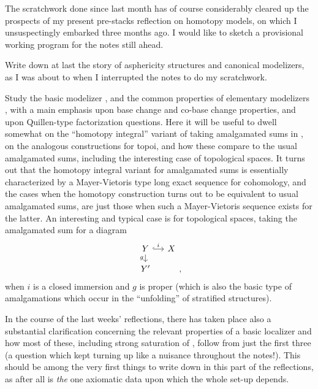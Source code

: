 \bigbreak
\noindent\hfill{}\par

\label{sec:71}%
The scratchwork done since last month has of course considerably
cleared up the prospects of my present pre-stacks reflection on
homotopy models, on which I unsuspectingly embarked three months
ago. I would like to sketch a provisional working program for the
notes still ahead.

 Write down at last the story of asphericity
structures and canonical modelizers, as I was about to when I
interrupted the notes to do my scratchwork.

 Study the basic modelizer \Cat, and the
common properties of elementary modelizers \Ahat, with a main emphasis
upon base change and co-base change properties, and upon Quillen-type
factorization questions. Here it will be useful to dwell somewhat on
the ``homotopy integral'' variant of taking amalgamated sums in \Cat,
on the analogous constructions for topoi, and how these compare to the
usual amalgamated sums, including the interesting case of topological
spaces. It turns out that the homotopy integral variant
for amalgamated sums is essentially characterized by a Mayer-Vietoris
type long exact sequence for cohomology, and the cases when the
homotopy construction turns out to be equivalent to usual amalgamated
sums, are just those when such a Mayer-Vietoris sequence exists for
the latter. An interesting and typical case is for topological spaces,
taking the amalgamated sum for a diagram
\[\begin{tikzcd}[baseline=(O.base),sep=small]
  Y\ar[r,hook,"i"] \ar[d,swap,"g"] & X \\
  |[alias=O]| Y' &
\end{tikzcd},\]
when $i$ is a closed immersion and $g$ is proper (which is also the
basic type of amalgamations which occur in the ``unfolding'' of
stratified structures).

In the course of the last weeks' reflections, there has taken place
also a substantial clarification concerning the relevant properties of
a basic localizer \scrW{} and how most of these, including strong
saturation of \scrW, follow from just the first three (a question which
kept turning up like a nuisance throughout the notes!). This should be
among the very first things to write down in this part of the
reflections, as \scrW{} after all is \emph{the} one axiomatic data
upon which the whole set-up depends.


